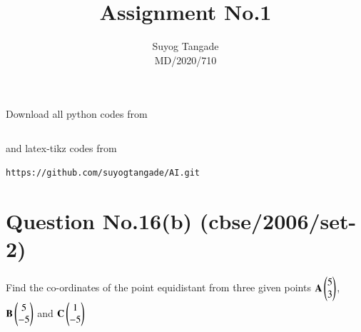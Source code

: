 \documentclass[journal,12pt,twocolumn]{IEEEtran}
\begin{document}
\def\rightbox#1{\makebox[0in][r]{#1}}
\def\centbox#1{\makebox[0in]{#1}}
\def\topbox#1{\raisebox{-\baselineskip}[0in][0in]{#1}}
\def\midbox#1{\raisebox{-0.5\baselineskip}[0in][0in]{#1}}
\vspace{3cm}
\title{Assignment No.1} 
\author{Suyog Tangade\\MD/2020/710} 
\maketitle
\newpage
\bigskip
\renewcommand{\thefigure}{\theenumi}
\renewcommand{\thetable}{\theenumi}
Download all python codes from
\begin{lstlisting}

\end{lstlisting}
%
and latex-tikz codes from
%
\begin{lstlisting}
https://github.com/suyogtangade/AI.git
\end{lstlisting}
%
\section{Question No.16(b) (cbse/2006/set-2)}

Find the co-ordinates of the point equidistant from three given points $\mathbf{A}\begin{pmatrix}5\\3\end{pmatrix}$, $\mathbf{B}\begin{pmatrix}5\\-5\end{pmatrix}$ and $\mathbf{C}\begin{pmatrix}1\\-5\end{pmatrix}$ 
\solution
\end{document}
